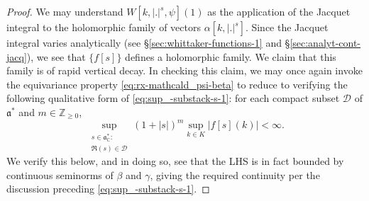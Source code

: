\begin{proof}
  We may understand $W[k,|.|^s, \psi](1)$ as the application of the Jacquet integral to the holomorphic family of vectors $\alpha[k,|.|^s]$.  Since the Jacquet integral varies analytically (see \S\ref{sec:whittaker-functions-1} and \S\ref{sec:analyt-cont-jacq}), we see that $\{f[s]\}$ defines a holomorphic family.  We claim that this family is of rapid vertical decay.  In checking this claim, we may once again invoke the equivariance property \eqref{eq:rx-mathcald_psi-beta} to reduce to verifying the following qualitative form of \eqref{eq:sup_-substack-s-1}: for each compact subset $\mathcal{D}$ of $\mathfrak{a}^*$ and $m \in \mathbb{Z}_{\geq 0}$,
  \begin{equation}\label{eq:sup_-substack-s}
    \sup_{
      \substack{
        s \in \mathfrak{a}_{\mathbb{C}}^* :  \\
        \Re(s) \in \mathcal{D}
      }
    }
    (1 + |s|)^{m}
    \sup_{k \in K}
    \left\lvert
      f[s](k)
    \right\rvert < \infty.
  \end{equation}
  We verify this below, and in doing so, see that the LHS is in fact bounded by continuous seminorms of $\beta$ and $\gamma$, giving the required continuity per the discussion preceding \eqref{eq:sup_-substack-s-1}.


\end{proof}
